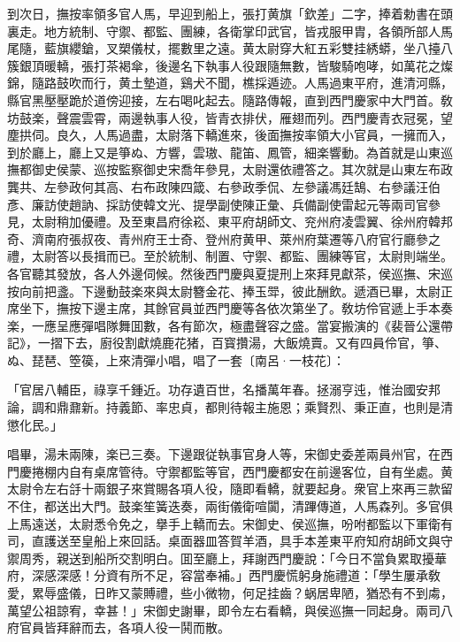 到次日，撫按率領多官人馬，早迎到船上，張打黄旗「欽差」二字，捧着勅書在頭裏走。地方統制、守禦、都監、團練，各衛掌印武官，皆戎服甲胄，各領所部人馬尾隨，藍旗纓鎗，叉槊儀杖，擺數里之遠。黄太尉穿大紅五彩雙挂綉蟒，坐八擡八簇銀頂暖轎，張打茶褐傘，後邊名下執事人役跟隨無數，皆駿騎咆哮，如萬花之燦錦，隨路鼓吹而行，黄土墊道，鷄犬不聞，樵採遁迹。人馬過東平府，進清河縣，縣官黑壓壓跪於道傍迎接，左右喝叱起去。隨路傳報，直到西門慶家中大門首。敎坊鼓楽，聲震雲霄，兩邊執事人役，皆青衣排伏，雁翅而列。西門慶青衣冠冕，望塵拱伺。良久，人馬過盡，太尉落下轎進來，後面撫按率領大小官員，一擁而入，到於廳上，廳上又是箏ぬ、方響，雲璈、龍笛、鳳管，細楽響動。為首就是山東巡撫都御史侯蒙、巡按監察御史宋喬年參見，太尉還依禮答之。其次就是山東左布政龔共、左參政何其高、右布政陳四箴、右參政季侃、左參議馮廷鵠、右參議汪伯彥、廉訪使趙訥、採訪使韓文光、提學副使陳正彙、兵備副使雷起元等兩司官參見，太尉稍加優禮。及至東昌府徐崧、東平府胡師文、兖州府凌雲翼、徐州府韓邦奇、濟南府張叔夜、青州府王士奇、登州府黄甲、萊州府葉遷等八府官行廳參之禮，太尉答以長揖而已。至於統制、制置、守禦、都監、團練等官，太尉則端坐。各官聽其發放，各人外邊伺候。然後西門慶與夏提刑上來拜見獻茶，侯巡撫、宋巡按向前把盞。下邊動鼓楽來與太尉簪金花、捧玉斝，彼此酬飲。遞酒已畢，太尉正席坐下，撫按下邊主席，其餘官員並西門慶等各依次第坐了。敎坊伶官遞上手本奏楽，一應呈應彈唱隊舞囬數，各有節次，極盡聲容之盛。當宴搬演的《裴晉公還帶記》，一摺下去，廚役割獻燒鹿花猪，百寳攢湯，大飯燒賣。又有四員伶官，箏、ぬ、琵琶、箜篌，上來清彈小唱，唱了一套〔南呂·一枝花〕：

\begin{myquote}
「官居八輔臣，祿享千鍾近。功存遺百世，名播萬年春。拯溺亨迍，惟治國安邦論，調和鼎鼐新。持義節、率忠貞，都則待報主施恩；乘賢烈、秉正直，也則是清懲化民。」
\end{myquote}

唱畢，湯未兩陳，楽已三奏。下邊跟従執事官身人等，宋御史委差兩員州官，在西門慶捲棚内自有桌席管待。守禦都監等官，西門慶都安在前邊客位，自有坐處。黄太尉令左右㧱十兩銀子來賞賜各項人役，隨即看轎，就要起身。衆官上來再三款留不住，都送出大門。鼓楽笙簧迭奏，兩街儀衛喧闐，清蹕傳道，人馬森列。多官俱上馬遠送，太尉悉令免之，擧手上轎而去。宋御史、侯巡撫，吩咐都監以下軍衛有司，直護送至皇船上來回話。桌面器皿答賀羊酒，具手本差東平府知府胡師文與守禦周秀，親送到船所交割明白。囬至廳上，拜謝西門慶說：「今日不當負累取擾華府，深感深感！分資有所不足，容當奉補。」西門慶慌躬身施禮道：「學生屢承敎愛，累辱盛儀，日昨又蒙賻禮，些小微物，何足挂齒？蜗居卑陋，猶恐有不到䖏，萬望公祖諒宥，幸甚！」宋御史謝畢，即令左右看轎，與侯巡撫一同起身。兩司八府官員皆拜辭而去，各項人役一鬨而散。


